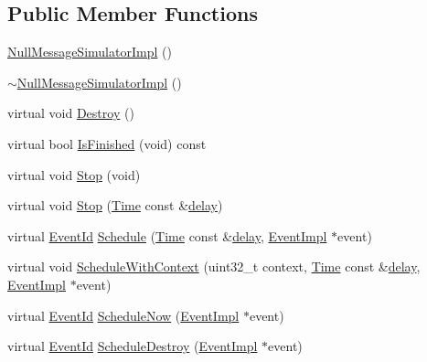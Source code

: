 \subsection*{Public Member Functions}
\begin{DoxyCompactItemize}
\item 
\hyperlink{classns3_1_1NullMessageSimulatorImpl_ac5c213c5a8413e38bd2324169c3b7ab4}{Null\+Message\+Simulator\+Impl} ()
\item 
\hyperlink{classns3_1_1NullMessageSimulatorImpl_a5a03e16b228c1f531caaae2396629904}{$\sim$\+Null\+Message\+Simulator\+Impl} ()
\item 
virtual void \hyperlink{classns3_1_1NullMessageSimulatorImpl_aa45b90f60fe697c05cad435444939875}{Destroy} ()
\item 
virtual bool \hyperlink{classns3_1_1NullMessageSimulatorImpl_a9674f4149dec2888e08fcd2f1394eb5d}{Is\+Finished} (void) const 
\item 
virtual void \hyperlink{classns3_1_1NullMessageSimulatorImpl_a5d2d24c1688ed9d18677b589f63905cd}{Stop} (void)
\item 
virtual void \hyperlink{classns3_1_1NullMessageSimulatorImpl_a1216d19d0217c35d58704f64ae728c13}{Stop} (\hyperlink{classns3_1_1Time}{Time} const \&\hyperlink{mmwave_2model_2fading-traces_2fading__trace__generator_8m_a7964e6aa8f61a9d28973c8267a606ad8}{delay})
\item 
virtual \hyperlink{classns3_1_1EventId}{Event\+Id} \hyperlink{classns3_1_1NullMessageSimulatorImpl_a632295ee391bb8451dead5b7fb7168f2}{Schedule} (\hyperlink{classns3_1_1Time}{Time} const \&\hyperlink{mmwave_2model_2fading-traces_2fading__trace__generator_8m_a7964e6aa8f61a9d28973c8267a606ad8}{delay}, \hyperlink{classns3_1_1EventImpl}{Event\+Impl} $\ast$event)
\item 
virtual void \hyperlink{classns3_1_1NullMessageSimulatorImpl_a8761d662824dc489d6417399c892949a}{Schedule\+With\+Context} (uint32\+\_\+t context, \hyperlink{classns3_1_1Time}{Time} const \&\hyperlink{mmwave_2model_2fading-traces_2fading__trace__generator_8m_a7964e6aa8f61a9d28973c8267a606ad8}{delay}, \hyperlink{classns3_1_1EventImpl}{Event\+Impl} $\ast$event)
\item 
virtual \hyperlink{classns3_1_1EventId}{Event\+Id} \hyperlink{classns3_1_1NullMessageSimulatorImpl_a9d4d44def3ebab5d2e1d96c0707889ab}{Schedule\+Now} (\hyperlink{classns3_1_1EventImpl}{Event\+Impl} $\ast$event)
\item 
virtual \hyperlink{classns3_1_1EventId}{Event\+Id} \hyperlink{classns3_1_1NullMessageSimulatorImpl_ad5d87440f6ac2f331c0e3b36ab8c4216}{Schedule\+Destroy} (\hyperlink{classns3_1_1EventImpl}{Event\+Impl} $\ast$event)

\end{DoxyCompactItemize}
